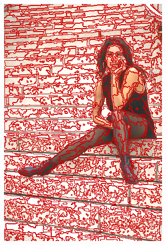 \begin{figure}
{		\includegraphics[scale=\scalefivebsdtest]{pictures/bsd-test-7-fh}
	}
	\subfigure{
}
\end{figure}
